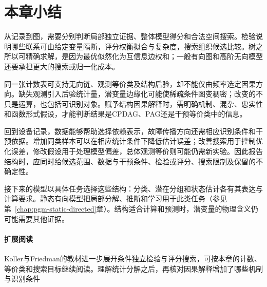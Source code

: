 \section{本章小结}
\label{sec:pgm-structure-learning-summary}

从记录到图，需要分别判断局部独立证据、整体模型得分和合法空间搜索。检验说明哪些联系可由给定变量隔断，评分权衡拟合与复杂度，搜索组织候选比较。树之所以可精确求解，是因为最优似然化为互信息边权和；一般有向图和高阶无向模型还要承担更大的搜索或归一化成本。

同一张计数表可支持无向链、观测等价类及结构后验，却不能仅由频率选定因果方向。缺失观测引入后验统计量，潜变量边缘化可能使稀疏条件图变稠密；改变的不只是运算，也包括可识别对象。赋予结构因果解释时，需明确机制、混杂、忠实性和函数形式假设，才能判断结果是CPDAG、PAG还是干预等价类中的信息。

回到设备记录，数据能够帮助选择依赖表示，故障传播方向还需相应识别条件和干预依据。增加同类样本可以在相应统计条件下降低估计误差；改善搜索用于控制优化误差，修改假设用于处理模型偏差，总体观测等价则可能仍需新实验。因此报告结构时，应同时给候选范围、数据与干预条件、检验或评分、搜索限制及保留的不确定性。

接下来的模型以具体任务选择这些结构：分类、潜在分组和状态估计各有其表达与计算要求。静态有向模型把局部分解、推断和学习用于此类任务（参见第~\ref{chap:pgm-static-directed}章）。结构适合计算和预测时，潜变量的物理含义仍可能需要其他证据。

\paragraph{扩展阅读}
Koller与Friedman的教材进一步展开条件独立检验与评分搜索，可按本章的计数、等价类和搜索目标继续阅读。理解统计分解之后，再核对因果解释增加了哪些机制与识别条件
